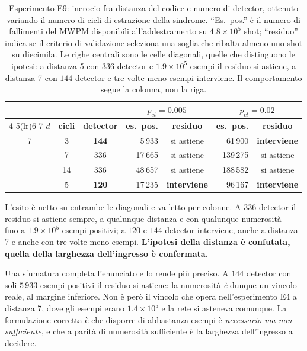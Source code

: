 \begin{table}[H]

\centering
\small
\begin{tabular}{ccc rc rc}
\toprule
& & & \multicolumn{2}{c}{$p_{ct} = 0.005$} & \multicolumn{2}{c}{$p_{ct} = 0.02$} \\
\cmidrule(lr){4-5}\cmidrule(lr){6-7}
$d$ & \textbf{cicli} & \textbf{detector} & \textbf{es.\ pos.} & \textbf{residuo} & \textbf{es.\ pos.} & \textbf{residuo} \\
\midrule
7 & \phantom{0}3 & \textbf{144} & \phantom{00}5\,933 & si astiene & \phantom{0}61\,900 & \textbf{interviene} \\
\addlinespace[0.3em]
7 & \phantom{0}7 & 336 & \phantom{0}17\,665 & si astiene & 139\,275 & si astiene \\
\addlinespace[0.3em]
5 & 14 & 336 & \phantom{0}48\,657 & si astiene & 188\,582 & si astiene \\
\addlinespace[0.3em]
5 & \phantom{0}5 & \textbf{120} & \phantom{0}17\,235 & \textbf{interviene} & \phantom{0}96\,167 & \textbf{interviene} \\
\bottomrule
\end{tabular}
\caption[Larghezza dell'ingresso contro distanza del codice]{Esperimento E9: incrocio fra distanza del codice e numero di detector, ottenuto variando il numero di cicli di estrazione della sindrome. ``Es.\ pos.'' è il numero di fallimenti del \ac{MWPM} disponibili all'addestramento su $4.8\times10^5$ shot; ``residuo'' indica se il criterio di validazione seleziona una soglia che ribalta almeno uno shot su diecimila. Le righe centrali sono le celle diagonali, quelle che distinguono le ipotesi: a distanza 5 con $336$ detector e $1.9\times10^5$ esempi il residuo si astiene, a distanza 7 con $144$ detector e tre volte meno esempi interviene. Il comportamento segue la colonna, non la riga.}\label{tab:neural_esempi}

\end{table}

L'esito è netto su entrambe le diagonali e va letto per colonne. A $336$ detector il residuo si astiene sempre, a qualunque distanza e con qualunque numerosità --- fino a $1.9\times10^5$ esempi positivi; a $120$ e $144$ detector interviene, anche a distanza 7 e anche con tre volte meno esempi. \textbf{L'ipotesi della distanza è confutata, quella della larghezza dell'ingresso è confermata.}

Una sfumatura completa l'enunciato e lo rende più preciso. A $144$ detector con soli $5\,933$ esempi positivi il residuo si astiene: la numerosità \emph{è} dunque un vincolo reale, al margine inferiore. Non è però il vincolo che opera nell'esperimento E4 a distanza 7, dove gli esempi erano $1.4\times10^5$ e la rete si asteneva comunque. La formulazione corretta è che disporre di abbastanza esempi è \emph{necessario ma non sufficiente}, e che a parità di numerosità sufficiente è la larghezza dell'ingresso a decidere.

